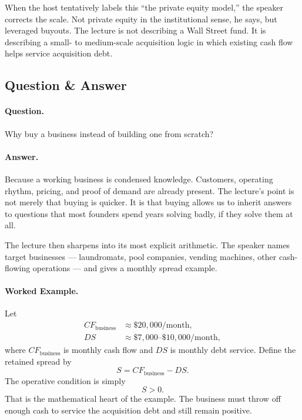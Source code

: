 When the host tentatively labels this ``the private equity model,'' the speaker corrects the scale. Not private equity in the institutional sense, he says, but leveraged buyouts. The lecture is not describing a Wall Street fund. It is describing a small- to medium-scale acquisition logic in which existing cash flow helps service acquisition debt.

\subsection{Question \& Answer}

\paragraph{Question.} Why buy a business instead of building one from scratch?

\paragraph{Answer.} Because a working business is condensed knowledge. Customers, operating rhythm, pricing, and proof of demand are already present. The lecture's point is not merely that buying is quicker. It is that buying allows us to inherit answers to questions that most founders spend years solving badly, if they solve them at all.

The lecture then sharpens into its most explicit arithmetic. The speaker names target businesses --- laundromats, pool companies, vending machines, other cash-flowing operations --- and gives a monthly spread example.

\paragraph{Worked Example.} Let
\begin{align}
CF_{\text{business}} &\approx \$20{,}000/\text{month}, \\
DS &\approx \$7{,}000\text{--}\$10{,}000/\text{month},
\end{align}
where \(CF_{\text{business}}\) is monthly cash flow and \(DS\) is monthly debt service. Define the retained spread by
\begin{equation}
S = CF_{\text{business}} - DS.
\end{equation}
The operative condition is simply
\begin{equation}
S > 0.
\end{equation}
That is the mathematical heart of the example. The business must throw off enough cash to service the acquisition debt and still remain positive.

